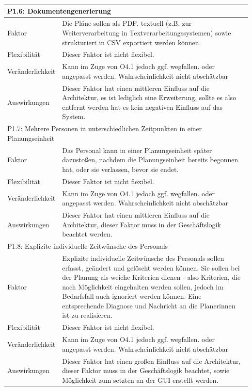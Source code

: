 \documentclass[fontsize=12pt,paper=a4,twoside]{scrartcl}
\begin{document}
\begin{tabularx}{\textwidth}{|l|X|}
\hline
\multicolumn{2}{|l|}{\textbf{P1.6: Dokumentengenerierung}}\\\hline
Faktor & Die Pläne sollen als PDF, textuell (z.B. zur Weiterverarbeitung in Textverarbeitungssystemen) sowie strukturiert in CSV exportiert werden können. \\\hline
Flexibilität & Dieser Faktor ist nicht flexibel. \\\hline
Veränderlichkeit & Kann im Zuge von O4.1 jedoch ggf. wegfallen. oder angepasst werden.  Wahrscheinlichkeit nicht abschätzbar \\\hline
Auswirkungen & Dieser Faktor hat einen mittleren Einfluss auf die Architektur, es ist lediglich eine Erweiterung, sollte es also entfernt werden hat es kein negativen Einfluss auf das System. \\\hline
\multicolumn{2}{|l|}{P1.7: Mehrere Personen in unterschiedlichen Zeitpunkten in einer Planungseinheit}\\\hline
Faktor & Das Personal kann in einer Planungseinheit später dazustoßen, nachdem die Planungseinheit bereits begonnen hat, oder sie verlassen, bevor sie endet. \\\hline
Flexibilität & Dieser Faktor ist nicht flexibel. \\\hline
Veränderlichkeit & Kann im Zuge von O4.1 jedoch ggf. wegfallen. oder angepasst werden.  Wahrscheinlichkeit nicht abschätzbar \\\hline
Auswirkungen & Dieser Faktor hat einen mittleren Einfluss auf die Architektur, dieser Faktor muss in der Geschäftslogik beachtet werden. \\\hline
\multicolumn{2}{|l|}{P1.8: Explizite individuelle Zeitwünsche des Personals}\\\hline
Faktor & Explizite individuelle Zeitwünsche des Personals sollen erfasst, geändert und gelöscht werden können. Sie sollen bei der Planung als weiche Kriterien dienen - also Kriterien, die nach Möglichkeit eingehalten werden sollen, jedoch im Bedarfsfall auch ignoriert werden können. Eine entsprechende Diagnose und Nachricht an die Planerinnen ist zu realisieren. \\\hline
Flexibilität & Dieser Faktor ist nicht flexibel. \\\hline
Veränderlichkeit & Kann im Zuge von O4.1 jedoch ggf. wegfallen. oder angepasst werden.  Wahrscheinlichkeit nicht abschätzbar \\\hline
Auswirkungen & Dieser Faktor hat einen großen Einfluss auf die Architektur, dieser Faktor muss in der Geschäftslogik beachtet, sowie Möglichkeit zum setzten an der GUI erstellt werden.  \\\hline
\end{tabularx} \newpage
\end{document}
